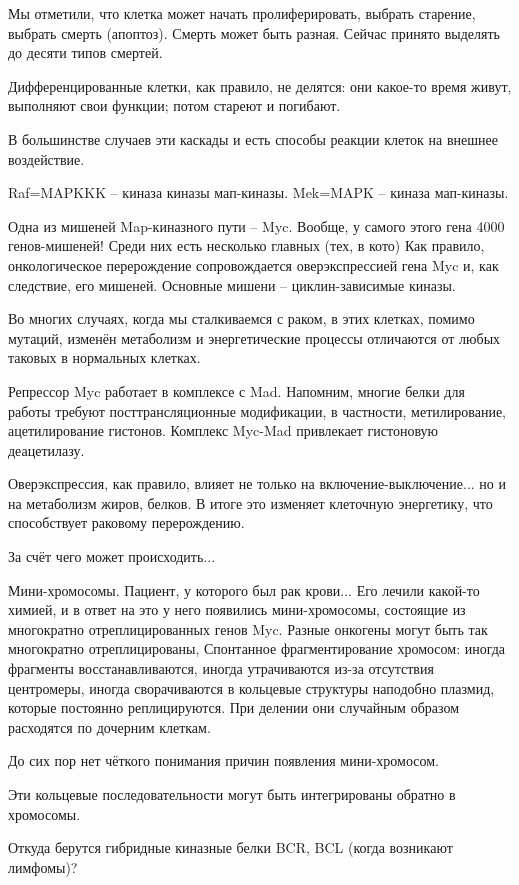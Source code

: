 \documentclass[main.tex]{subfiles}
\begin{document}
Мы отметили, что клетка может начать пролиферировать, выбрать старение, выбрать смерть (апоптоз).
Смерть может быть разная.
Сейчас принято выделять до десяти типов смертей.

Дифференцированные клетки, как правило, не делятся: они какое-то время живут, выполняют свои функции; потом стареют и погибают.

В большинстве случаев эти каскады и есть способы реакции клеток на внешнее воздействие.

Raf=MAPKKK -- киназа киназы мап-киназы.
Mek=MAPK -- киназа мап-киназы.

Одна из мишеней Map-киназного пути -- Myc.
Вообще, у самого этого гена 4000 генов-мишеней!
Среди них есть несколько главных (тех, в кото)
Как правило, онкологическое перерождение сопровождается оверэкспрессией гена Myc и, как следствие, его мишеней.
Основные мишени -- циклин-зависимые киназы.

Во многих случаях, когда мы сталкиваемся с раком, в этих клетках, помимо мутаций, изменён метаболизм и энергетические процессы отличаются от любых таковых в нормальных клетках.

Репрессор Myc работает в комплексе с Mad.
Напомним, многие белки для работы требуют посттрансляционные модификации, в частности, метилирование, ацетилирование гистонов.
Комплекс Myc-Mad привлекает гистоновую деацетилазу.

Оверэкспрессия, как правило, влияет не только на включение-выключение...
но и на метаболизм жиров, белков.
В итоге это изменяет клеточную энергетику, что способствует раковому перерождению.

За счёт чего может происходить...

Мини-хромосомы.
Пациент, у которого был рак крови... Его лечили какой-то химией, и в ответ на это у него появились мини-хромосомы, состоящие из многократно отреплицированных генов Myc.
Разные онкогены могут быть так многократно отреплицированы, 
Спонтанное фрагментирование хромосом: иногда фрагменты восстанавливаются, иногда утрачиваются из-за отсутствия центромеры, иногда сворачиваются в кольцевые структуры наподобно плазмид, которые постоянно реплицируются.
При делении они случайным образом расходятся по дочерним клеткам.

До сих пор нет чёткого понимания причин появления мини-хромосом.

Эти кольцевые последовательности могут быть интегрированы обратно в хромосомы.

Откуда берутся гибридные киназные белки BCR, BCL (когда возникают лимфомы)?
\end{document}
